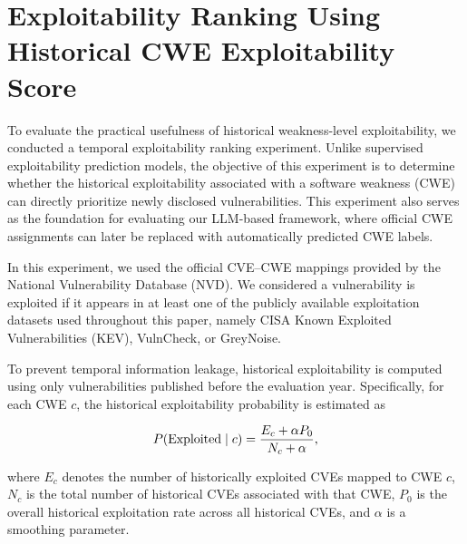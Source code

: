 \documentclass[conference,compsoc]{IEEEtran}
\begin{document}
\section{Exploitability Ranking Using Historical CWE Exploitability Score}
\label{sec:exploitability-ranking}

To evaluate the practical usefulness of historical weakness-level exploitability, we conducted a temporal exploitability ranking experiment. Unlike supervised exploitability prediction models, the objective of this experiment is to determine whether the historical exploitability associated with a software weakness (CWE) can directly prioritize newly disclosed vulnerabilities. This experiment also serves as the foundation for evaluating our LLM-based framework, where official CWE assignments can later be replaced with automatically predicted CWE labels.


In this experiment, we used the official CVE--CWE mappings provided by the National Vulnerability Database (NVD). We considered a vulnerability is exploited if it appears in at least one of the publicly available exploitation datasets used throughout this paper, namely CISA Known Exploited Vulnerabilities (KEV), VulnCheck, or GreyNoise.

To prevent temporal information leakage, historical exploitability is computed using only vulnerabilities published before the evaluation year. Specifically, for each CWE $c$, the historical exploitability probability is estimated as

\begin{equation}
\small
P(\mathrm{Exploited}\mid c)=
\frac{E_c+\alpha P_0}
{N_c+\alpha},
\label{eq:historical_exploitability}
\end{equation}

where $E_c$ denotes the number of historically exploited CVEs mapped to CWE $c$, $N_c$ is the total number of historical CVEs associated with that CWE, $P_0$ is the overall historical exploitation rate across all historical CVEs, and $\alpha$ is a smoothing parameter.
\end{document}
